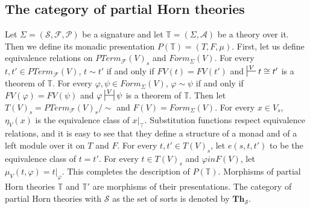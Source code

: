 \documentclass[reqno]{amsart}
\theoremstyle{definition}
\theoremstyle{remark}
\newcommand{\cat}[1]{\mathbf{#1}}
\newcommand{\Th}{\cat{Th}}
\numberwithin{figure}{section}
\begin{document}
\subsection{The category of partial Horn theories}

Let $\Sigma = (\mathcal{S},\mathcal{F},\mathcal{P})$ be a signature and let $\mathbb{T} = (\Sigma,\mathcal{A})$ be a theory over it.
Then we define its monadic presentation $P(\mathbb{T}) = (T,F,\mu)$.
First, let us define equivalence relations on $PTerm_\mathcal{F}(V)_s$ and $Form_\Sigma(V)$.
For every $t, t' \in PTerm_\mathcal{F}(V)$, $t \sim t'$ if and only if $FV(t) = FV(t')$ and $\sststile{}{V} t \cong t'$ is a theorem of $\mathbb{T}$.
For every $\varphi, \psi \in Form_\Sigma(V)$, $\varphi \sim \psi$ if and only if $FV(\varphi) = FV(\psi)$ and $\varphi \ssststile{}{V} \psi$ is a theorem of $\mathbb{T}$.
Then let $T(V)_s = PTerm_\mathcal{F}(V)_s/\sim$ and $F(V) = Form_\Sigma(V)$.
For every $x \in V_s$, $\eta_V(x)$ is the equivalence class of $x|_\top$.
Substitution functions respect equivalence relations, and it is easy to see that they define a structure of a monad and of a left module over it on $T$ and $F$.
For every $t,t' \in T(V)_s$, let $e(s,t,t')$ to be the equivalence class of $t = t'$.
For every $t \in T(V)_s$ and $\varphi in F(V)$, let $\mu_V(t,\varphi) = t|_\varphi$.
This completes the description of $P(\mathbb{T})$.
Morphisms of partial Horn theories $\mathbb{T}$ and $\mathbb{T}'$ are morphisms of their presentations.
The category of partial Horn theories with $\mathcal{S}$ as the set of sorts is denoted by $\Th_\mathcal{S}$.
\end{document}
